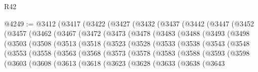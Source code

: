 \begin{lexlean}{R42}
\begin{coremodule}
{@4249 := @3412
    (@3417
      (@3422
        (@3427
          (@3432
            (@3437
              (@3442
                (@3447
                  (@3452
                    (@3457
                      (@3462
                        (@3467
                          (@3472
                            (@3473
                              (@3478
                                (@3483
                                  (@3488
                                    (@3493
                                      (@3498
                                        (@3503
                                          (@3508
                                            (@3513
                                              (@3518
                                                (@3523
                                                  (@3528
                                                    (@3533
                                                      (@3538
                                                        (@3543
                                                          (@3548
                                                            (@3553
                                                              (@3558
                                                                (@3563
                                                                  (@3568
                                                                    (@3573
                                                                      (@3578
                                                                        (@3583
                                                                          (@3588
                                                                            (@3593
                                                                              (@3598
                                                                                (@3603
                                                                                  (@3608
                                                                                    (@3613
                                                                                      (@3618
                                                                                        (@3623
                                                                                          (@3628
                                                                                            (@3633
                                                                                              (@3638
                                                                                                (@3643
}
\end{coremodule}
\end{lexlean}
